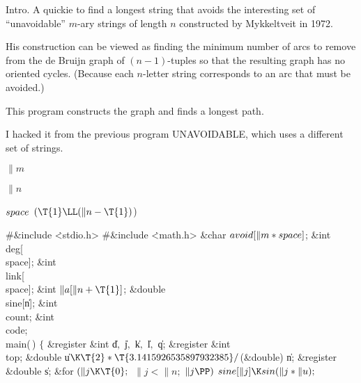 
\datethis

Intro. A quickie to find a longest string that avoids the interesting
set of ``unavoidable'' $m$-ary strings of length $n$ constructed by
Mykkeltveit in 1972.

His construction can be viewed as finding the minimum number of arcs
to remove from the de Bruijn graph of $(n-1)$-tuples so that the
resulting graph has no oriented cycles. (Because each $n$-letter string
corresponds to an arc that must be avoided.)

This program constructs the graph and finds a longest path.

I hacked it from the previous program {\mc UNAVOIDABLE}, which uses
a different set of strings.

\Y\B\4\D$\|m$ \5
\par
\B\4\D$\|n$ \5
\par
\B\4\D$\\{space}$ \5
$(\T{1}\LL(\|n-\T{1}){}$)\par
\Y\B\8\#\&{include} \.{<stdio.h>}\6
\8\#\&{include} \.{<math.h>}\6
\&{char} ${}\\{avoid}[\|m*\\{space}]{}$;\6
\&{int} \\{deg}[\\{space}];\6
\&{int} \\{link}[\\{space}];\6
\&{int} ${}\|a[\|n+\T{1}]{}$;\6
\&{double} \\{sine}[\|n];\6
\&{int} \\{count};\6
\&{int} \\{code};\7
\\{main}(\,)\1\1\2\2\6
${}\{{}$\1\6
\&{register} \&{int} \|d${},{}$ \|j${},{}$ \|k${},{}$ \|l${},{}$ \|q;\6
\&{register} \&{int} \\{top};\6
\&{double} \|u${}\K\T{2}*\T{3.1415926535897932385}/{}$(\&{double}) \|n;\6
\&{register} \&{double} \|s;\7
\&{for} ${}(\|j\K\T{0};{}$ ${}\|j<\|n;{}$ ${}\|j\PP){}$\1\5
${}\\{sine}[\|j]\K\\{sin}(\|j*\|u);{}$\2\6
